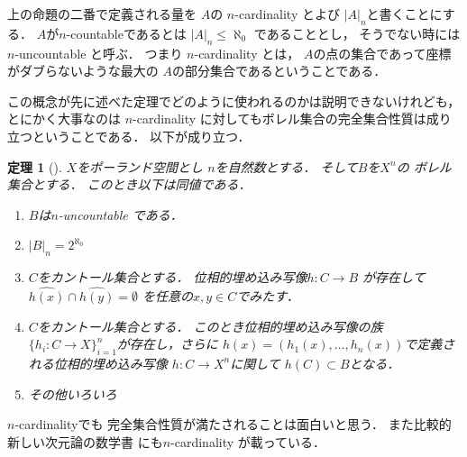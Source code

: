 \documentclass[leqno, a4paper, 12pt]{jsarticle}
\newtheorem{thm}{定理}
\begin{document}
上の命題の二番で定義される量を
$A$の
$n$-cardinality
とよび
$|A|_{n}$と書くことにする．
$A$が$n$-countableであるとは
$|A|_{n}\le \aleph_{0}$
であることとし，
そうでない時には
$n$-uncountable 
と呼ぶ．
つまり
$n$-cardinality
とは，
$A$の点の集合であって座標がダブらないような最大の
$A$の部分集合であるということである．

この概念が先に述べた定理でどのように使われるのかは説明できないけれども，
とにかく大事なのは
$n$-cardinality
に対してもボレル集合の完全集合性質は成り立つということである．
以下が成り立つ．

\begin{thm}[\cite{MR0491191}]
$X$をポーランド空間とし
$n$を自然数とする．
そして$B$を$X^{n}$の
ボレル集合とする．
このとき以下は同値である．
\begin{enumerate}[label=\textup{(\arabic*)}]
\item 
$B$は$n$-uncountable 
である．
\item 
$|B|_{n}=2^{\aleph_{0}}$

\item
$C$をカントール集合とする．
位相的埋め込み写像$h\colon C\to B$
が存在して
$\widehat{h(x)}\cap \widehat{h(y)}=\emptyset$
を任意の$x, y\in C$でみたす．

\item 
$C$をカントール集合とする．
このとき位相的埋め込み写像の族
$\{h_{i}\colon C\to X\}_{i=1}^{n}$が存在し，さらに
$h(x)=(h_{1}(x), \dots, h_{n}(x))$で定義される位相的埋め込み写像
$h\colon C\to X^{n}$に関して
$h(C)\subset B$となる．

\item 
その他いろいろ

\end{enumerate}
\end{thm}
$n$-cardinalityでも
完全集合性質が満たされることは面白いと思う．
また比較的新しい次元論の数学書
\cite{MR3970309}
にも$n$-cardinality
が載っている．

\nocite{*}


\end{document}
